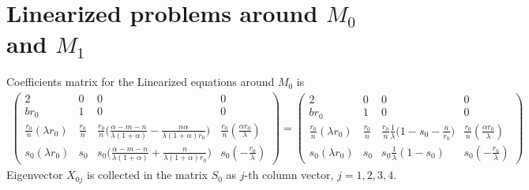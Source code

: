\documentclass[a4paper,11pt]{article}
\begin{document}
\section{Linearized problems around $M_0$ and $M_1$}\label{append:lin}
Coefficients matrix for the Linearized equations around $M_0$ is
\begin{align*}
 \begin{pmatrix}
          2 & 0 & 0 & 0 \\
          br_0 & 1 & 0 & 0\\
          \frac{r_0}{n}(\lambda r_0) & \frac{r_0}{n} & \frac{r_0}{n}\Big(\frac{\alpha-m-n}{\lambda(1+\alpha)} - \frac{n\alpha}{\lambda(1+\alpha)r_0}\Big) & \frac{r_0}{n}(\frac{\alpha r_0}{\lambda})\\
          s_0(\lambda r_0) & s_0 & s_0\Big(\frac{\alpha-m-n}{\lambda(1+\alpha)} + \frac{n}{\lambda(1+\alpha)r_0}\Big) & s_0(-\frac{r_0}{\lambda})
         \end{pmatrix}
        =\begin{pmatrix}
          2 & 0 & 0 & 0 \\
          br_0 & 1 & 0 & 0\\
          \frac{r_0}{n}(\lambda r_0) & \frac{r_0}{n} & \frac{r_0}{n}\frac{1}{\lambda}\Big(1-s_0-\frac{n}{r_0}\Big) & \frac{r_0}{n}(\frac{\alpha r_0}{\lambda})\\
          s_0(\lambda r_0) & s_0 & s_0\frac{1}{\lambda}(1-s_0) & s_0(-\frac{r_0}{\lambda})
         \end{pmatrix}
\end{align*}
Eigenvector $X_{0j}$ is collected in the matrix $S_0$ as $j$-th column vector, $j=1,2,3,4$. 
\end{document}

